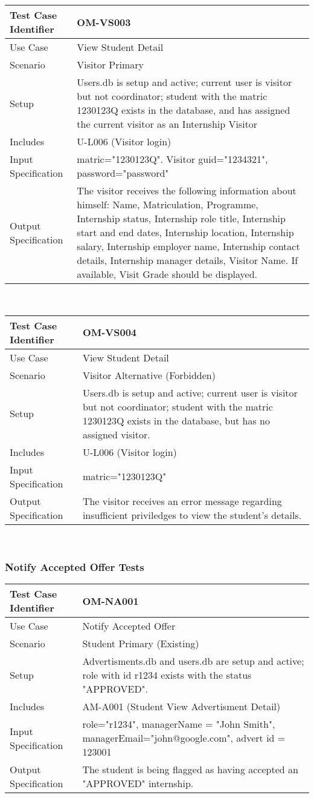 \documentclass{l3deliverable}
\begin{document}
\begin{tabular}{lp{10cm}}
\hline 
\textbf{Test Case Identifier} & OM-VS003\tabularnewline
\hline 
\hline 
Use Case & View Student Detail \tabularnewline
\hline 
Scenario & Visitor Primary \tabularnewline
\hline 
Setup & Users.db is setup and active; current user is visitor but not coordinator; student with the matric 1230123Q exists in the database, and has assigned the current visitor as an Internship Visitor \tabularnewline
\hline 
Includes & U-L006 (Visitor login) \tabularnewline
\hline 
Input Specification & matric="1230123Q". Visitor guid="1234321", password="password" \tabularnewline
\hline 
Output Specification & The visitor receives the following information about himself: Name, Matriculation, Programme, Internship status, Internship role title, Internship start and end dates, Internship location, Internship salary, Internship employer name, Internship contact details, Internship manager details, Visitor Name. If available, Visit Grade should be displayed.\tabularnewline
\hline 
\end{tabular}\\

\begin{tabular}{lp{10cm}}
\hline 
\textbf{Test Case Identifier} & OM-VS004\tabularnewline
\hline 
\hline 
Use Case & View Student Detail \tabularnewline
\hline 
Scenario & Visitor Alternative (Forbidden) \tabularnewline
\hline 
Setup & Users.db is setup and active; current user is visitor but not coordinator; student with the matric 1230123Q exists in the database, but has no assigned visitor. \tabularnewline
\hline 
Includes & U-L006 (Visitor login) \tabularnewline
\hline 
Input Specification & matric="1230123Q" \tabularnewline
\hline 
Output Specification & The visitor receives an error message regarding insufficient priviledges to view the student's details.\tabularnewline
\hline 
\end{tabular}\\

\subsubsection{Notify Accepted Offer Tests}

\begin{tabular}{lp{10cm}}
\hline 
\textbf{Test Case Identifier} & OM-NA001\tabularnewline
\hline 
\hline 
Use Case & Notify Accepted Offer \tabularnewline
\hline 
Scenario & Student Primary (Existing) \tabularnewline
\hline 
Setup & Advertisments.db and users.db are setup and active; role with id r1234 exists with the status "APPROVED".\tabularnewline
\hline 
Includes & AM-A001 (Student View Advertisment Detail) \tabularnewline
\hline 
Input Specification & role="r1234", managerName = "John Smith", managerEmail="john@google.com", advert id = 123001 \tabularnewline
\hline 
Output Specification & The student is being flagged as having accepted an "APPROVED" internship.\tabularnewline
\hline 
\end{tabular}\\
\end{document}
